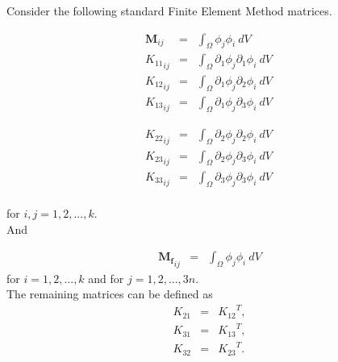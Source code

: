 Consider the following standard Finite Element Method matrices.

\noindent\begin{minipage}{.5\linewidth}
	\begin{eqnarray*}
		\mathbf{M}_{ij} & = & \int_{\Omega} \phi_j \phi_i \ dV \ \\
		{K_{11}}_{ij} & = & \int_{\Omega} \partial_1\phi_j \partial_1\phi_i \ dV \  \\
		{K_{12}}_{ij} & = & \int_{\Omega} \partial_1\phi_j \partial_2\phi_i \ dV \ \\
		{K_{13}}_{ij} & = & \int_{\Omega} \partial_1\phi_j \partial_3\phi_i \ dV \ 
	\end{eqnarray*}
\end{minipage}%
\begin{minipage}{.5\linewidth}
	\begin{eqnarray*}
		{K_{22}}_{ij} & = & \int_{\Omega} \partial_2\phi_j \partial_2\phi_i \ dV \  \\
		{K_{23}}_{ij} & = & \int_{\Omega} \partial_2\phi_j \partial_3\phi_i \ dV \ \\
		{K_{33}}_{ij} & = & \int_{\Omega} \partial_3\phi_j \partial_3\phi_i \ dV \ \\
	\end{eqnarray*}
\end{minipage}
for $i,j = 1,2,...,k.$\\

And

\begin{eqnarray*}
	\mathbf{M_f}_{ij} & = & \int_{\Omega} \phi_j \phi_i \ dV
\end{eqnarray*}
for $i = 1,2,...,k$ and for $j = 1,2,...,3n.$\\

The remaining matrices can be defined as
\begin{eqnarray*}
	{K_{21}} & = & {K_{12}}^{T},\\
	{K_{31}} & = & {K_{13}}^{T}, \\
	{K_{32}} & = & {K_{23}}^{T}. \\
\end{eqnarray*}


